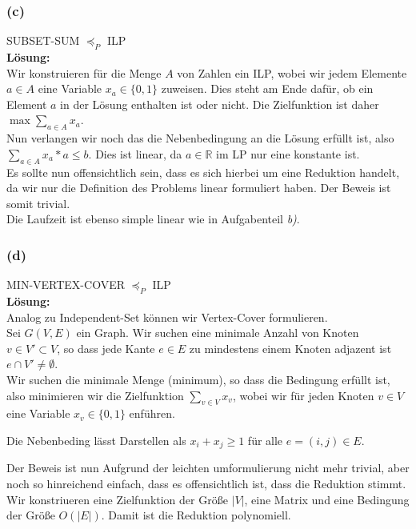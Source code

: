 \documentclass[11pt,a4paper,ngerman]{article}
\begin{document}
\subsubsection*{(c)}
SUBSET-SUM $\preceq_P$ ILP\\

\textbf{Lösung:}\\

Wir konstruieren für die Menge $A$ von Zahlen ein ILP,
wobei wir jedem Elemente $a \in A$ eine Variable $x_a \in \{0 , 1 \}$ zuweisen.
Dies steht am Ende dafür, ob ein Element $a$ in der Lösung enthalten ist oder nicht.
Die Zielfunktion ist daher
$\max \underset{ a \in A }{\sum} x_a$.\\

Nun verlangen wir noch das die Nebenbedingung an die Lösung erfüllt ist, also
$\underset{ a \in A }{\sum} x_a * a \leq b$.
Dies ist linear, da $a \in \mathbb{R}$ im LP nur eine konstante ist.\\

Es sollte nun offensichtlich sein, dass es sich hierbei um eine Reduktion handelt,
da wir nur die Definition des Problems linear formuliert haben. Der Beweis ist
somit trivial.\\

Die Laufzeit ist ebenso simple linear wie in Aufgabenteil \emph{b)}.

\subsubsection*{(d)}
MIN-VERTEX-COVER $\preceq_P$ ILP\\

\textbf{Lösung:}\\

Analog zu Independent-Set können wir Vertex-Cover formulieren.\\

Sei $G(V,E)$ ein Graph. Wir suchen eine minimale Anzahl von Knoten $v \in V' \subset V$, so
dass jede Kante $e \in E$ zu mindestens einem Knoten adjazent ist $e \cap V' \not= \emptyset$.\\

Wir suchen die minimale Menge (minimum), so dass die Bedingung erfüllt ist, also minimieren
wir die Zielfunktion $\underset{v \in V}{\sum} x_v$, wobei wir für jeden Knoten $v\in V$
eine Variable $x_v \in \{ 0, 1 \}$ enführen.

Die Nebenbeding lässt Darstellen als
$x_i + x_j \geq 1$ für alle $e = (i,j) \in E$.

Der Beweis ist nun Aufgrund der leichten umformulierung nicht mehr trivial, aber noch so hinreichend
einfach, dass es offensichtlich ist, dass die Reduktion stimmt.\\

Wir konstriueren eine Zielfunktion der Größe $|V|$, eine Matrix und eine Bedingung der Größe $O(|E|)$.
Damit ist die Reduktion polynomiell.

\label{LastPage}
\end{document}
